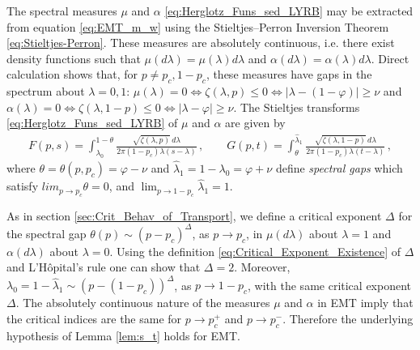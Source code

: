 \documentclass[english,12pt,jmp,graphicx]{revtex4-1}
\begin{document}
The spectral measures $\mu$ and $\alpha$ \eqref{eq:Herglotz_Funs_sed_LYRB}
may be extracted from equation \eqref{eq:EMT_m_w} using the Stieltjes--Perron
Inversion Theorem \eqref{eq:Stieltjes-Perron}. These measures are
absolutely continuous, i.e. there exist density functions such that
$\mu(d\lambda)=\mu(\lambda)d\lambda$ and $\alpha(d\lambda)=\alpha(\lambda)d\lambda$. Direct calculation shows
that, for $p\neq p_c,1-p_c$, these measures have gaps in the spectrum
about $\lambda=0,1$: $\mu(\lambda)=0\iff\zeta(\lambda,p)\leq0\iff|\lambda-(1-\varphi)|\geq\nu$ and
$\alpha(\lambda)=0\iff\zeta(\lambda,1-p)\leq0\iff|\lambda-\varphi|\geq\nu$.     
The Stieltjes transforms \eqref{eq:Herglotz_Funs_sed_LYRB} of $\mu$ and
$\alpha$ are given by 
%
\begin{align}\label{eq:EFM_Fs_Gt}
  F(p,s)%
      =\int_{\lambda_0}^{1-\theta}\frac{\sqrt{\zeta(\lambda,p)}\,d\lambda}{2\pi(1-p_c)\lambda(s-\lambda)}\,,
      \qquad 
  G(p,t)%
      =\int_{\theta}^{\hat{\lambda}_1}\frac{\sqrt{\zeta(\lambda,1-p)}\,d\lambda}{2\pi(1-p_c)\lambda(t-\lambda)}\,,
\end{align}
%
where $\theta=\theta(p,p_c)=\varphi-\nu$ and $\hat{\lambda}_1=1-\lambda_0=\varphi+\nu$ define \emph{spectral
  gaps} which satisfy $lim_{p\to p_c}\theta=0$, and $\lim_{p\to1-p_c}\hat{\lambda}_1=1$. 

As in section \ref{sec:Crit_Behav_of_Transport}, we define a critical
exponent $\Delta$ for the spectral gap $\theta(p)\sim(p-p_c)^\Delta$, as $p\to p_c$, in
$\mu(d\lambda)$ about $\lambda=1$ and $\alpha(d\lambda)$ about $\lambda=0$. Using the definition
\eqref{eq:Critical_Exponent_Existence} of $\Delta$ and L'H{\^o}pital's
rule one can show that $\Delta=2$. Moreover,
$\lambda_0=1-\hat{\lambda}_1\sim(p-(1-p_c))^\Delta$, as $p\to1-p_c$, with the same critical 
exponent $\Delta$.  The absolutely continuous nature of the measures
$\mu$ and $\alpha$ in EMT imply that the critical indices are the same
for $p\to p_c^+$ and $p\to p_c^-$. Therefore the underlying hypothesis of
Lemma \ref{lem:s_t} holds for EMT. 
\end{document}

